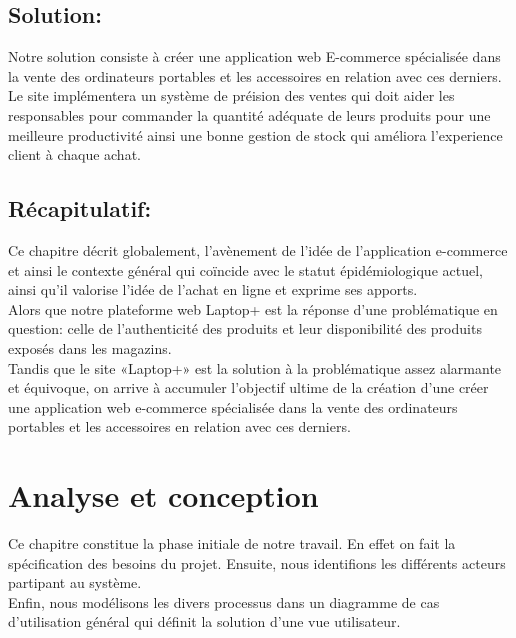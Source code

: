 \documentclass[a4paper]{report}
\begin{document}
\begin{doublespace}
    \section{ Solution:}
    Notre solution consiste à créer une application web E-commerce spécialisée dans la vente des ordinateurs portables et les accessoires en relation avec ces derniers. Le site implémentera un système de préision des ventes qui doit aider les responsables
    pour commander la quantité adéquate de leurs produits pour une meilleure productivité ainsi une bonne gestion de stock qui améliora l'experience client à chaque achat.

    \begin{figure}[H]
        \begin{center}
        \end{center}
    \end{figure}

    \newpage
    \section{Récapitulatif:}
    Ce chapitre décrit globalement, l’avènement de l'idée de l'application e-commerce et ainsi le contexte général qui coïncide avec le statut épidémiologique actuel, ainsi qu’il valorise l’idée de l'achat en ligne et exprime ses apports. \\Alors que notre plateforme web Laptop+ est la réponse d’une problématique en question: celle de l'authenticité des produits et leur disponibilité des produits exposés dans les magazins. \\Tandis que le site «Laptop+» est la solution à la problématique assez alarmante et équivoque, on arrive à accumuler l’objectif ultime de la création d’une
    créer une application web e-commerce spécialisée dans la vente des ordinateurs portables et les accessoires en relation avec ces
    derniers.

    \newpage
    \chapter{Analyse et conception}

    \renewcommand{\headrulewidth}{1pt}
    \fancyhead[L]{\hspace*{5cm}}
    \begin{doublespace}

        Ce chapitre constitue la phase initiale de notre travail. En effet on fait la spécification des besoins du projet. Ensuite, nous identifions les différents acteurs partipant au système.\\Enfin, nous
        modélisons les divers processus dans un diagramme de cas d’utilisation général qui définit la solution d'une vue utilisateur.

\end{doublespace}
\end{doublespace}
\end{document}
